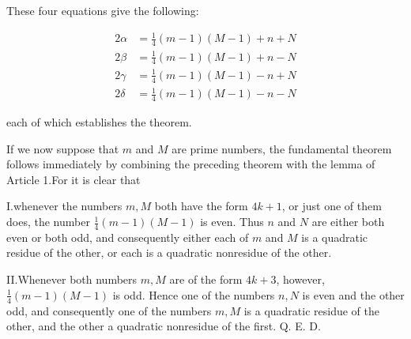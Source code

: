 These four equations give the following:

\[
\begin{aligned}
2\alpha&=\tfrac14(m-1)(M-1)+n+N\\
2\beta&=\tfrac14(m-1)(M-1)+n-N\\
2\gamma&=\tfrac14(m-1)(M-1)-n+N\\
2\delta&=\tfrac14(m-1)(M-1)-n-N
\end{aligned}
\]

each of which establishes the theorem.


If we now suppose that $m$ and $M$ are prime numbers, the fundamental theorem follows immediately by combining the preceding theorem with the lemma of Article 1.\quad For it is clear that

I.\quad whenever the numbers $m,M$ both have the form $4k+1$, or just one of them does, the number $\frac14(m-1)(M-1)$ is even. Thus $n$ and $N$ are either both even or both odd, and consequently either each of $m$ and $M$ is a quadratic residue of the other, or each is a quadratic nonresidue of the other.

II.\quad Whenever both numbers $m,M$ are of the form $4k+3$, however, \mbox{$\frac14(m-1)(M-1)$} is odd. Hence one of the numbers $n,N$ is even and the other odd, and consequently one of the numbers $m,M$ is a quadratic residue of the other, and the other a quadratic nonresidue of the first. Q. E. D.
